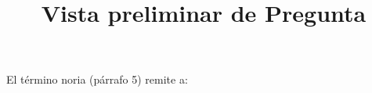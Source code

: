 \documentclass[a4paper,10pt]{article}\usepackage[utf8]{inputenc}\usepackage[spanish]{babel}\usepackage{times}
\title{Vista preliminar de Pregunta}
\begin{document}
\twocolumn 

\maketitle

El término noria (párrafo 5) remite a:
\end{document}
